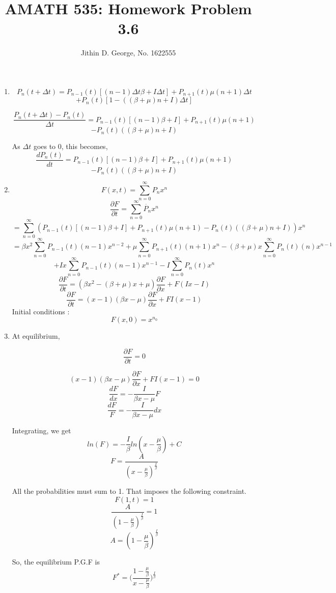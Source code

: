 \documentclass[a4paper,12pt]{article}
\title{\normalsize AMATH 535: Homework Problem 3.6}
\author{\normalsize Jithin D. George, No. 1622555}
\begin{document}
\maketitle
\begin{enumerate}

	
	\item 
	\[P_n(t+\Delta t) = P_{n-1}(t)[(n-1)\Delta t \beta +I\Delta t]+P_{n+1}(t)\mu(n+1)\Delta t  \] \[   +  P_{n}(t)[1- ((\beta +\mu)n+I)\Delta t]\]
	
		\[\frac{P_n(t+\Delta t) - P_{n}(t)}{\Delta t}= P_{n-1}(t)[(n-1) \beta +I]+P_{n+1}(t)\mu(n+1) \] \[   -  P_{n}(t) ((\beta +\mu)n+I)\]
		
		As $ \Delta t$ goes to 0, this becomes,
				\[\frac{dP_n(t)}{dt}= P_{n-1}(t)[(n-1) \beta +I]+P_{n+1}(t)\mu(n+1) \] \[   -  P_{n}(t) ((\beta +\mu)n+I)\]
				
	\item
		\[F(x,t)= \sum_{n=0}^{\infty} P_n x^n\]
		\[\frac{\partial  F}{\partial t}= \sum_{n=0}^{\infty} \dot{P_n} x^n \]
	\[= \sum_{n=0}^{\infty} ( P_{n-1}(t)[(n-1) \beta +I]+P_{n+1}(t)\mu(n+1) -  P_{n}(t) ((\beta +\mu)n+I) ) x^n \]
	\[= \beta x^2\sum_{n=0}^{\infty} P_{n-1}(t)(n-1) x^{n-2} + \mu \sum_{n=0}^{\infty} P_{n+1}(t)(n+1) x^{n}  -(\beta+\mu)x  \sum_{n=0}^{\infty} P_{n}(t)(n) x^{n-1} \]\[ +Ix\sum_{n=0}^{\infty} P_{n-1}(t)(n-1) x^{n-1}-  I \sum_{n=0}^{\infty} P_{n}(t)x^n \]
	\[\frac{\partial  F}{\partial t} = (\beta x^2   -(\beta+\mu)x + \mu) \frac{\partial  F}{\partial x} + F(Ix-I) \]
		\[\frac{\partial  F}{\partial t} = (x-1)(\beta x-\mu) \frac{\partial  F}{\partial x} + FI(x-1) \]
	Initial conditions : \[F(x,0)= x^{n_0} \]
	
	\item At equilibrium, 
	
		\[\frac{\partial  F}{\partial t} = 0\]

				\[ (x-1)(\beta x-\mu) \frac{\partial  F}{\partial x} + FI(x-1) =0 \]
				\[ \frac{dF}{dx}= -\frac{I}{\beta x-\mu} F\]
					\[ \frac{dF}{F}= -\frac{I}{\beta x-\mu} dx\]
					
					Integrating, we get
					\[ln(F)= -\frac{I}{\beta} ln(x-\frac{\mu}{\beta}) +C \]
					\[F= \frac{A}{(x-\frac{\mu}{\beta})^\frac{I}{\beta}}\]
					
					All the probabilities must sum to 1. That imposes the following constraint.
					\[F(1,t)= 1\] 
					\[\frac{A}{(1-\frac{\mu}{\beta})^\frac{I}{\beta}}= 1\] 
					\[A =(1-\frac{\mu}{\beta})^\frac{I}{\beta} \]
					
					So, the equilibrium P.G.F is
					\[F^* =\big( \frac{1-\frac{\mu}{\beta}}{x-\frac{\mu}{\beta}}\big)^{\frac{I}{\beta}} \]


\end{enumerate}
\end{document}
